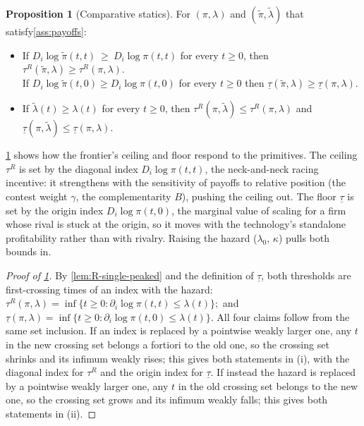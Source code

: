 \documentclass[12pt,reqno]{article}
\theoremstyle{definition} \newtheorem{example}{Example}
\theoremstyle{definition} \newtheorem{condition}{Condition}
\theoremstyle{definition} \newtheorem{corollary}{Corollary}
\theoremstyle{definition} \newtheorem{claim}{Claim}
\theoremstyle{definition} \newtheorem{definition}{Definition}
\theoremstyle{definition} \newtheorem{conjecture}{Conjecture}
\theoremstyle{definition} \newtheorem{Lemma}{Lemma}
\theoremstyle{definition} \newtheorem{lemma}{Lemma}
\theoremstyle{plain} \newtheorem{theorem}{Theorem}
\theoremstyle{definition} \newtheorem{assumption}{Assumption}
\theoremstyle{definition} \newtheorem*{assumptionnonumber}{Assumption}
\theoremstyle{definition} \newtheorem*{theoremNoNumber}{Proposition}
\theoremstyle{definition}
\theoremstyle{definition}\newtheorem{proposition}{Proposition}
\theoremstyle{definition} \newtheorem{result}{Result}
\theoremstyle{definition} \newtheorem*{definitionNoNumber}{Definition}
\theoremstyle{definition} \newtheorem{Definition}{Definition}
\theoremstyle{definition} \newtheorem*{DefinitionNoNumber}{Definition}
\theoremstyle{definition} \newtheorem*{fact}{Fact}
\theoremstyle{definition} \newtheorem*{property}{Property}
\theoremstyle{definition} \newtheorem{remark}{Remark}
\begin{document}
\begin{proposition}[Comparative statics]\label{prop:cs-tauR}
For $(\pi,\lambda)$ and $(\tilde\pi,\tilde\lambda)$ that satisfy\cref{ass:payoffs}: 
\begin{itemize}
    \item[(i)] If $D_i\log\tilde\pi(t,t)\ \ge\ D_i\log\pi(t,t)$ for every $t\ge0$, then $\tau^R(\tilde\pi,\lambda)\ge\tau^R(\pi,\lambda)$. \\ 
     If $D_i \log \tilde \pi(t,0) \geq D_i \log  \pi(t,0)$ for every $t \geq 0$ then $\underline \tau (\tilde \pi, \lambda) \geq \underline \tau (\pi,\lambda)$. 
    \item[(ii)] If $\tilde\lambda(t)\ge\lambda(t)$ for every $t\ge0$, then $\tau^R(\pi,\tilde\lambda)\le\tau^R(\pi,\lambda)$ and $\underline \tau(\pi, \tilde \lambda) \leq \underline \tau(\pi,\lambda)$.
\end{itemize}
\end{proposition}

\cref{prop:cs-tauR} shows how the frontier's ceiling and floor respond to the primitives. The ceiling $\tau^R$ is set by the diagonal index $D_i\log\pi(t,t)$, the neck-and-neck racing incentive: it strengthens with the sensitivity of payoffs to relative position (the contest weight $\gamma$, the complementarity $B$), pushing the ceiling out. The floor $\underline\tau$ is set by the origin index $D_i\log\pi(t,0)$, the marginal value of scaling for a firm whose rival is stuck at the origin, so it moves with the technology's standalone profitability rather than with rivalry. Raising the hazard ($\lambda_0$, $\kappa$) pulls both bounds in. 


\begin{proof}[Proof of \cref{prop:cs-tauR}]
By \cref{lem:R-single-peaked} and the definition of $\underline\tau$, both thresholds are first-crossing times of an index with the hazard:
$
\tau^R(\pi,\lambda)=\inf\{t\ge0:\partial_i\log\pi(t,t)\le\lambda(t)\}; 
$
and 
$
\underline\tau(\pi,\lambda)=\inf\{t\ge0:\partial_i\log\pi(t,0)\le\lambda(t)\}.
$
All four claims follow from the same set inclusion. If an index is replaced by a pointwise weakly larger one, any $t$ in the new crossing set belongs a fortiori to the old one, so the crossing set shrinks and its infimum weakly rises; this gives both statements in (i), with the diagonal index for $\tau^R$ and the origin index for $\underline\tau$. If instead the hazard is replaced by a pointwise weakly larger one, any $t$ in the old crossing set belongs to the new one, so the crossing set grows and its infimum weakly falls; this gives both statements in (ii).
\end{proof}
\end{document}
